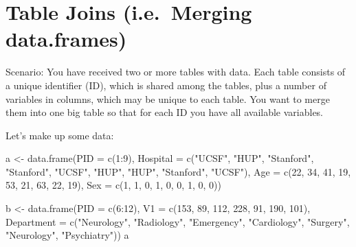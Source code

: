 \documentclass[
]{book}
\newenvironment{Shaded}{\begin{snugshade}}{\end{snugshade}}
\newcommand{\AttributeTok}[1]{\textcolor[rgb]{0.77,0.63,0.00}{#1}}
\newcommand{\DecValTok}[1]{\textcolor[rgb]{0.00,0.00,0.81}{#1}}
\newcommand{\FunctionTok}[1]{\textcolor[rgb]{0.00,0.00,0.00}{#1}}
\newcommand{\NormalTok}[1]{#1}
\newcommand{\OtherTok}[1]{\textcolor[rgb]{0.56,0.35,0.01}{#1}}
\newcommand{\SpecialCharTok}[1]{\textcolor[rgb]{0.00,0.00,0.00}{#1}}
\newcommand{\StringTok}[1]{\textcolor[rgb]{0.31,0.60,0.02}{#1}}
\begin{document}
\hypertarget{table-joins-i.e.-merging-data.frames}{%
\section{Table Joins (i.e.~Merging data.frames)}\label{table-joins-i.e.-merging-data.frames}}

Scenario: You have received two or more tables with data. Each table consists of a unique identifier (ID), which is shared among the tables, plus a number of variables in columns, which may be unique to each table. You want to merge them into one big table so that for each ID you have all available variables.

Let's make up some data:

\begin{Shaded}
\begin{Highlighting}[]
\NormalTok{a }\OtherTok{\textless{}{-}} \FunctionTok{data.frame}\NormalTok{(}\AttributeTok{PID =} \FunctionTok{c}\NormalTok{(}\DecValTok{1}\SpecialCharTok{:}\DecValTok{9}\NormalTok{),}
                \AttributeTok{Hospital =} \FunctionTok{c}\NormalTok{(}\StringTok{"UCSF"}\NormalTok{, }\StringTok{"HUP"}\NormalTok{, }\StringTok{"Stanford"}\NormalTok{,}
                             \StringTok{"Stanford"}\NormalTok{, }\StringTok{"UCSF"}\NormalTok{, }\StringTok{"HUP"}\NormalTok{, }
                             \StringTok{"HUP"}\NormalTok{, }\StringTok{"Stanford"}\NormalTok{, }\StringTok{"UCSF"}\NormalTok{),}
                \AttributeTok{Age =} \FunctionTok{c}\NormalTok{(}\DecValTok{22}\NormalTok{, }\DecValTok{34}\NormalTok{, }\DecValTok{41}\NormalTok{, }\DecValTok{19}\NormalTok{, }\DecValTok{53}\NormalTok{, }\DecValTok{21}\NormalTok{, }\DecValTok{63}\NormalTok{, }\DecValTok{22}\NormalTok{, }\DecValTok{19}\NormalTok{),}
                \AttributeTok{Sex =} \FunctionTok{c}\NormalTok{(}\DecValTok{1}\NormalTok{, }\DecValTok{1}\NormalTok{, }\DecValTok{0}\NormalTok{, }\DecValTok{1}\NormalTok{, }\DecValTok{0}\NormalTok{, }\DecValTok{0}\NormalTok{, }\DecValTok{1}\NormalTok{, }\DecValTok{0}\NormalTok{, }\DecValTok{0}\NormalTok{))}

\NormalTok{b  }\OtherTok{\textless{}{-}} \FunctionTok{data.frame}\NormalTok{(}\AttributeTok{PID =} \FunctionTok{c}\NormalTok{(}\DecValTok{6}\SpecialCharTok{:}\DecValTok{12}\NormalTok{),}
                 \AttributeTok{V1 =} \FunctionTok{c}\NormalTok{(}\DecValTok{153}\NormalTok{, }\DecValTok{89}\NormalTok{, }\DecValTok{112}\NormalTok{, }\DecValTok{228}\NormalTok{,  }\DecValTok{91}\NormalTok{, }\DecValTok{190}\NormalTok{, }\DecValTok{101}\NormalTok{),}
                 \AttributeTok{Department =} \FunctionTok{c}\NormalTok{(}\StringTok{"Neurology"}\NormalTok{, }\StringTok{"Radiology"}\NormalTok{,}
                                \StringTok{"Emergency"}\NormalTok{, }\StringTok{"Cardiology"}\NormalTok{,}
                                \StringTok{"Surgery"}\NormalTok{, }\StringTok{"Neurology"}\NormalTok{, }\StringTok{"Psychiatry"}\NormalTok{))}
\NormalTok{a}
\end{Highlighting}
\end{Shaded}
\end{document}
